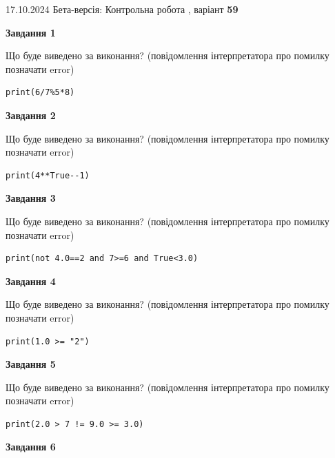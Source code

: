 \documentclass[12pt, ukrainian]{article}
\begin{document}
{\Large{17.10.2024 Бета-версія: Контрольна робота , варіант  \No \textbf { 59 }\par}}
{
\begin {large}
{\begin {center}\textbf{Завдання 1}\end {center}}

Що буде виведено за виконання? (повідомлення інтерпретатора про помилку позначати error)\par
\begin{verbatim}
print(6/7%5*8)
\end{verbatim}

{\begin {center}\textbf{Завдання 2}\end {center}}

Що буде виведено за виконання? (повідомлення інтерпретатора про помилку позначати error)\par
\begin{verbatim}
print(4**True--1)
\end{verbatim}

{\begin {center}\textbf{Завдання 3}\end {center}}

Що буде виведено за виконання? (повідомлення інтерпретатора про помилку позначати error)\par
\begin{verbatim}
print(not 4.0==2 and 7>=6 and True<3.0)
\end{verbatim}

{\begin {center}\textbf{Завдання 4}\end {center}}

Що буде виведено за виконання? (повідомлення інтерпретатора про помилку позначати error)\par
\begin{verbatim}
print(1.0 >= "2")
\end{verbatim}

{\begin {center}\textbf{Завдання 5}\end {center}}

Що буде виведено за виконання? (повідомлення інтерпретатора про помилку позначати error)\par
\begin{verbatim}
print(2.0 > 7 != 9.0 >= 3.0)
\end{verbatim}

{\begin {center}\textbf{Завдання 6}\end {center}}


\end{large}}
\end{document}
